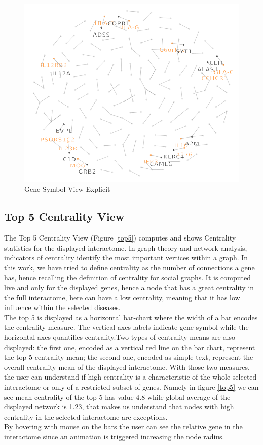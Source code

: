 \documentclass[12pt,twocolumn,twoside]{article}
\begin{document}
	\begin{figure}
		\includegraphics[width=.95\linewidth]{net2.png}
		\caption{Gene Symbol View Explicit}
		\label{net2}
	\end{figure}
	
	
	\subsection*{Top 5 Centrality View}
	The Top 5 Centrality View (Figure \ref{top5}) computes and shows Centrality statistics for the displayed interactome. In graph theory and network analysis, indicators of centrality identify the most important vertices within a graph.  In this work, we have tried to define centrality as the number of connections a gene has, hence recalling the definition of centrality for social graphs. It is computed live and only for the displayed genes, hence a node that has a great centrality in the full interactome, here can have a low centrality, meaning that it has low influence within the selected diseases. \\ The top 5 is displayed as a horizontal bar-chart where the width of a bar encodes the centrality measure. The vertical axes labels indicate gene symbol while the horizontal axes quantifies centrality.\newline Two types of centrality means are also displayed: the first one, encoded as a vertical red line on the bar chart, represent the top 5 centrality mean; the second one, encoded as simple text, represent the overall centrality mean of the displayed interactome. With those two measures, the user can understand if high centrality is a characteristic of the whole selected interactome or only of a restricted subset of genes. Namely in figure \ref{top5} we can see mean centrality of the top 5 has value 4.8 while global average of the displayed network is 1.23, that makes us understand that nodes with high centrality in the selected interactome are exceptions.\\ By hovering with mouse on the bars the user can see the relative gene in the interactome since an animation is triggered increasing the node radius.
	
\end{document}
